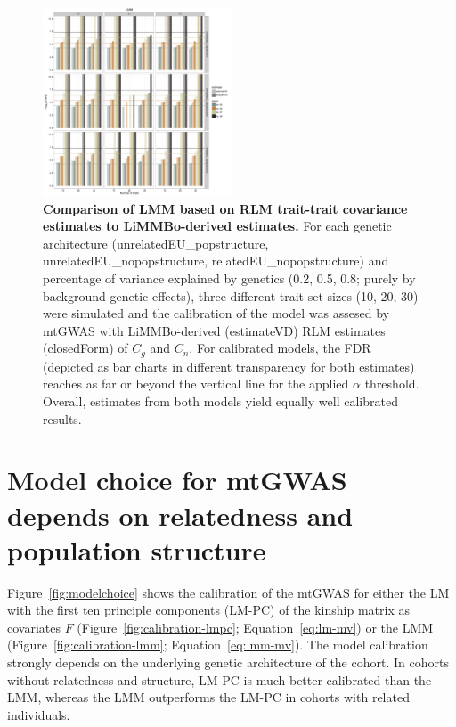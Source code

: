  \begin{figure}[hbtp]
	\centering
	\includegraphics[trim = 0mm 0mm 0mm 0mm, clip, width=0.5\textwidth]{Chapter1/Figures/20161205_calibrationBGOnly_closedForm.pdf}
	\caption[Comparison of LMM based on RLM trait-trait covariance estimates to LiMMBo-derived estimates]{\textbf{Comparison of LMM based on RLM trait-trait covariance estimates to LiMMBo-derived estimates.}  For each genetic architecture (unrelatedEU\_popstructure, unrelatedEU\_nopopstructure, relatedEU\_nopopstructure) and percentage of variance explained by genetics (0.2, 0.5, 0.8; purely by background genetic effects), three different trait set sizes (10, 20, 30) were simulated and the calibration of the model was assesed by mtGWAS with LiMMBo-derived (estimateVD) RLM estimates (closedForm) of \(C_g\) and \(C_n\). For calibrated models, the FDR (depicted as bar charts in different transparency for both estimates) reaches as far or beyond the vertical line for the applied \(\alpha\) threshold. Overall, estimates from both models yield equally well calibrated results.}
 	\label{fig:closedForm}
\end{figure}

 
 \section{Model choice for mtGWAS depends on relatedness and population structure}
 \label{section:modelchoice}
Figure~\ref{fig:modelchoice} shows the calibration of the mtGWAS for either the LM with the first ten principle components (LM-PC) of the kinship matrix as covariates \(F\) (Figure~\ref{fig:calibration-lmpc}; Equation~\ref{eq:lm-mv}) or the LMM  (Figure~\ref{fig:calibration-lmm}; Equation~\ref{eq:lmm-mv}). The model calibration strongly depends on the underlying genetic architecture of the cohort. In cohorts without relatedness and structure,  LM-PC is much better calibrated than the LMM, whereas the LMM outperforms the LM-PC in cohorts with related individuals.


